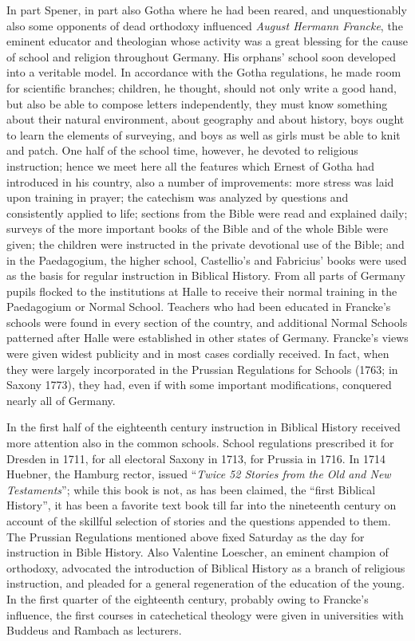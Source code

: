 In part Spener, in part also Gotha where he had been reared, and unquestionably also some opponents of dead orthodoxy influenced \emph{August Hermann Francke}, the eminent educator and theologian whose activity was a great blessing for the cause of school and religion throughout Germany. His orphans’ school soon developed into a veritable model. In accordance with the Gotha regulations, he made room for scientific branches; children, he thought, should not only write a good hand, but also be able to compose letters independently, they must know something about their natural environment, about geography and about history, boys ought to learn the elements of surveying, and boys as well as girls must be able to knit and patch. One half of the school time, however, he devoted to religious instruction; hence we meet here all the features which Ernest of Gotha had introduced in his country, also a number of improvements: more stress was laid upon training in prayer; the catechism was analyzed by questions and consistently applied to life; sections from the Bible were read and explained daily; surveys of the more important books of the Bible and of the whole Bible were given; the children were instructed in the private devotional use of the Bible; and in the Paedagogium, the higher school, Castellio’s and Fabricius’ books were used as the basis for regular instruction in Biblical History. From all parts of Germany pupils flocked to the institutions at Halle to receive their normal training in the Paedagogium or Normal School. Teachers who had been educated in Francke’s schools were found in every section of the country, and additional Normal Schools patterned after Halle were
established in other states of Germany. Francke’s views were given widest publicity and in most cases cordially received. In fact, when they were largely incorporated in the Prussian Regulations for Schools (1763; in Saxony 1773), they had, even if with some important modifications, conquered nearly all of Germany.

In the first half of the eighteenth century instruction in Biblical History received more attention also in the common schools. School regulations prescribed it for Dresden in 1711, for all electoral Saxony in 1713, for Prussia in 1716. In 1714 Huebner, the Hamburg rector, issued “\emph{Twice 52 Stories from the Old and New Testaments}”; while this book is not, as has been claimed, the “first Biblical History”, it has been a favorite text book till far into the nineteenth century on account of the skillful selection of stories and the questions appended to them. The Prussian Regulations mentioned above fixed Saturday as the day for instruction in Bible History. Also Valentine Loescher, an eminent champion of orthodoxy, advocated the introduction of Biblical History as a branch of religious instruction, and pleaded for a general regeneration of the education of the young. In the first quarter of the eighteenth century, probably owing to Francke’s influence, the first courses in catechetical theology were given in universities with Buddeus and Rambach as lecturers.

